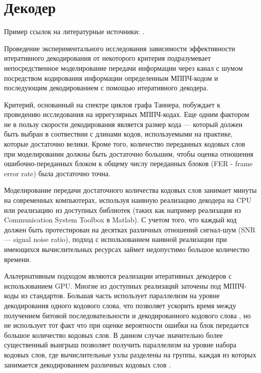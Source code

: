 \chapter{Декодер}

Пример ссылок на литературные источники: \cite{hall-combinatorics,kudryashov-codingtheory,finding-and-counting-given-length-cycles,counting-short-cycles-of-quasi-cyclic-protograph-ldpc-codes,message-passing-algorithm-for-counting-short-cycles-in-graph,how-to-find-long-paths-efficiently,color-coding,algorithm-for-counting-for-counting-short-cycles-in-bipartite-graphs,on-the-number-of-cycles-in-a-graph,understanding-belief-propogation,mackay-codes}.


Проведение экспериментального исследования зависимости эффективности итеративного декодирования от некоторого
критерия подразумевает непосредственное моделирование передачи информации через канал с шумом посредством 
кодирования информации определенным МППЧ-кодом и последующим декодированием с помощью итеративного декодера.

Критерий, основанный на спектре циклов графа Таннера, побуждает к проведению исследования на иррегулярных
МППЧ-кодах. Еще одним фактором не в пользу скорости декодирования является размер кода --- который
должен быть выбран в соотвествии с длинами кодов, используемыми на практике, которые достаточно велики.
Кроме того, количество переданных кодовых слов при моделировании должны быть достаточно большим, чтобы оценка
отношения ошибочно-переданных блоком к общему числу переданных блоков (FER - frame error rate) была достаточно точна.

Моделирование передачи достаточного количества кодовых слов занимает минуты на современных 
компьютерах, используя наивную реализацию декодера на CPU или реализацию из доступных библиотек 
(таких как например реализация из Communication System Toolbox в Matlab). 
С учетом того, что каждый код должен быть протестирован на десятках различных отношений сигнал-шум (SNR ---
signal noise ratio), подход с использованием наивной реализации при имеющихся вычислительных ресурсах займет
недопустимо большое количество времени. 

Альтернативным подходом являются реализации итеративных декодеров с использованием
GPU.
Многие из доступных реализаций заточены под МППЧ-коды из стандартов. Большая часть использует параллелизм
на уровне декодирования одного кодового слова, что позволяет ускорить время между получением 
битовой последовательности и декодированного кодового слова
\cite{stressing-the-ber-simulation-of-ldpc-codes-in-the-error-floor-region-using-gpu-clusters}, 
но не использует тот факт что при оценке вероятности ошибки на блок передается большое количество кодовых
слов. В данном случае значительно более существенный выигрыш позволяет получить параллелизм
на уровне набора кодовых слов, где вычислительные узлы разделены на группы, каждая из которых занимается
декодированием различных кодовых слов
\cite{opencl-cuda-algorithms-for-parallel-decoding-of-any-irregular-ldpc-code-using-gpu}.

